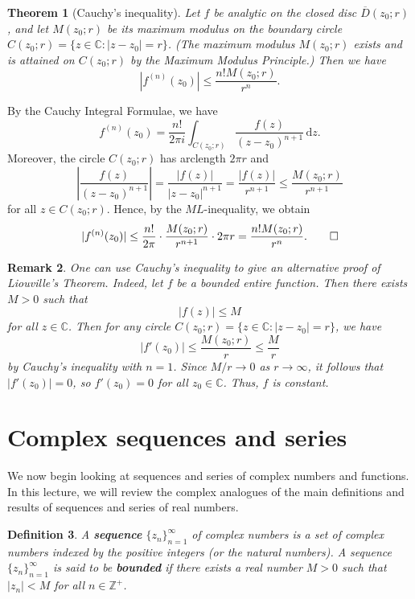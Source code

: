 \documentclass[10pt]{article}
\makeatletter
\newcommand{\C}{\mathbb{C}}
\newcommand{\Z}{\mathbb{Z}}
\newcommand{\dd}{\,\mathrm{d}}
\theoremstyle{newstyle}
\newtheorem{thm}{Theorem}[section]
\newtheorem{remark}[thm]{Remark}
\newtheorem{defn}[thm]{Definition}
\newenvironment{pf}[1][\proofname]{\par
  \pushQED{\qed}%
  \normalfont \topsep0\p@\relax
  \trivlist
  \item[\hskip\labelsep\scshape
  #1\@addpunct{.}]\ignorespaces
}{%
  \popQED\endtrivlist\@endpefalse
}
\makeatother
\begin{document}
\begin{thm}[Cauchy's inequality]
Let $f$ be analytic on the closed disc $\overline{D}(z_0; r)$, and let $M(z_0; r)$ 
be its maximum modulus on the boundary circle $C(z_0; r) = \{z \in \C : |z - z_0| = r\}$. 
(The maximum modulus $M(z_0; r)$ exists and is attained on $C(z_0; r)$ by the Maximum 
Modulus Principle.) Then we have 
\[ |f^{(n)}(z_0)| \leq \frac{n!M(z_0; r)}{r^n}. \]
\end{thm}
\begin{pf}
By the Cauchy Integral Formulae, we have 
\[ f^{(n)}(z_0) = \frac{n!}{2\pi i} \int_{C(z_0; r)} \frac{f(z)}{(z-z_0)^{n+1}}\dd z. \]
Moreover, the circle $C(z_0; r)$ has arclength $2\pi r$ and 
\[ \left| \frac{f(z)}{(z-z_0)^{n+1}} \right| = \frac{|f(z)|}{|z-z_0|^{n+1}}
= \frac{|f(z)|}{r^{n+1}} \leq \frac{M(z_0; r)}{r^{n+1}} \]
for all $z \in C(z_0; r)$. Hence, by the $ML$-inequality, we obtain 
\[ |f^{(n)}(z_0)| \leq \frac{n!}{2\pi} \cdot \frac{M(z_0; r)}{r^{n+1}} \cdot 2\pi r = 
\frac{n!M(z_0; r)}{r^n}. \qedhere \]
\end{pf}

\begin{remark}
One can use Cauchy's inequality to give an alternative proof of Liouville's Theorem. 
Indeed, let $f$ be a bounded entire function. Then there exists $M > 0$ such that 
\[ |f(z)| \leq M \] 
for all $z \in \C$. Then for any circle $C(z_0; r) = \{z \in \C : |z - z_0| = r\}$, we have 
\[ |f'(z_0)| \leq \frac{M(z_0; r)}r \leq \frac{M}r \]
by Cauchy's inequality with $n = 1$. Since $M/r \to 0$ as $r \to \infty$, it follows that 
$|f'(z_0)| = 0$, so $f'(z_0) = 0$ for all $z_0 \in \C$. Thus, $f$ is constant. 
\end{remark}

\newpage 
\section{Complex sequences and series}

We now begin looking at sequences and series of complex numbers and functions. 
In this lecture, we will review the complex analogues of the main definitions and results of 
sequences and series of real numbers.

\begin{defn}
A {\bf sequence} $\{z_n\}_{n=1}^\infty$ of complex numbers is a set of complex numbers 
indexed by the positive integers (or the natural numbers). A sequence $\{z_n\}_{n=1}^\infty$ 
is said to be {\bf bounded} if there exists a real number $M > 0$ such that 
$|z_n| < M$ for all $n \in \Z^+$. 
\end{defn}
\end{document}
